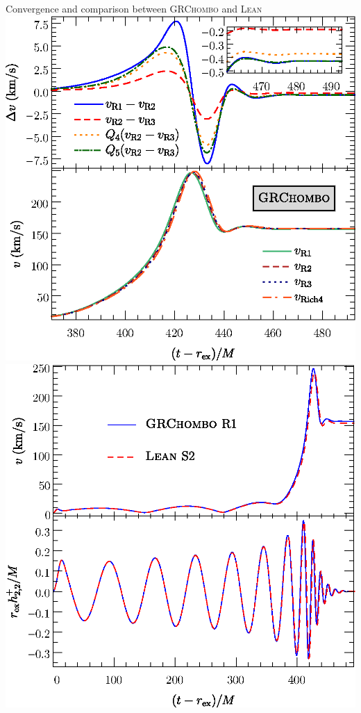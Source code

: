 \documentclass[smaller,aspectratio=169]{beamer}
\begin{document}
\appendix
\begin{frame}{Convergence and comparison between 
\textsc{GRChombo} and \textsc{Lean}}
    \includegraphics[width=0.45\linewidth]{grchombo-convergence5.eps}
    \hfill
    \includegraphics[width=0.45\linewidth]{grchombo-lean-comparison3.eps}
\end{frame}
\end{document}
